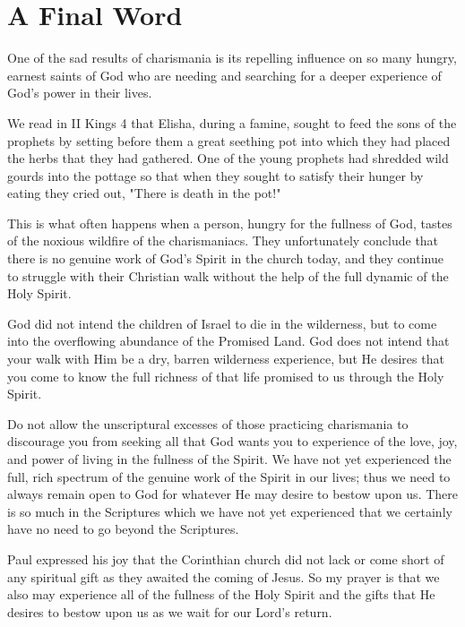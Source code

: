 \chapter{A Final Word}

One of the sad results of charismania is its repelling influence on so many hungry, earnest saints of God who are needing and searching for a deeper experience of God's power in their lives. 

We read in II Kings 4 that Elisha, during a famine, sought to feed the sons of the prophets by setting before them a great seething pot into which they had placed the herbs that they had gathered. One of the young prophets had shredded wild gourds into the pottage so that when they sought to satisfy their hunger by eating they cried out, "There is death in the pot!" 

This is what often happens when a person, hungry for the fullness of God, tastes of the noxious wildfire of the charismaniacs. They unfortunately conclude that there is no genuine work of God's Spirit in the church today, and they continue to struggle with their Christian walk without the help of the full dynamic of the Holy Spirit. 

God did not intend the children of Israel to die in the wilderness, but to come into the overflowing abundance of the Promised Land. God does not intend that your walk with Him be a dry, barren wilderness experience, but He desires that you come to know the full richness of that life promised to us through the Holy Spirit. 

Do not allow the unscriptural excesses of those practicing charismania to discourage you from seeking all that God wants you to experience of the love, joy, and power of living in the fullness of the Spirit. We have not yet experienced the full, rich spectrum of the genuine work of the Spirit in our lives; thus we need to always remain open to God for whatever He may desire to bestow upon us. There is so much in the Scriptures which we have not yet experienced that we certainly have no need to go beyond the Scriptures. 

Paul expressed his joy that the Corinthian church did not lack or come short of any spiritual gift as they awaited the coming of Jesus. So my prayer is that we also may experience all of the fullness of the Holy Spirit and the gifts that He desires to bestow upon us as we wait for our Lord's return. 


